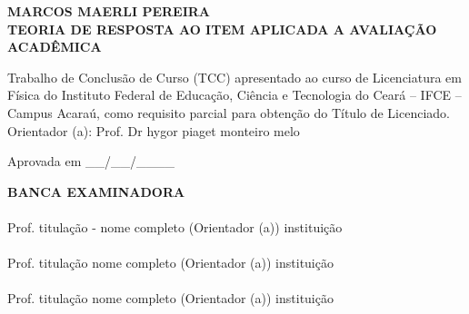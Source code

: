 \begin{center}
		\textbf{MARCOS MAERLI PEREIRA}\\
		\vspace{2cm}
		\textbf{TEORIA DE RESPOSTA AO ITEM APLICADA A AVALIAÇÃO ACADÊMICA}
	\end{center}
	\vspace{2cm}
		\hspace{\mylength}\begin{minipage}{8cm}
			
			Trabalho de Conclusão de Curso (TCC) apresentado ao curso de Licenciatura em Física do Instituto Federal
			de Educação, Ciência e Tecnologia do
			Ceará – IFCE – Campus Acaraú, como requisito
			parcial para obtenção do Título de Licenciado.
			\vspace*{0.7cm}
			\\Orientador (a): Prof. Dr hygor piaget monteiro melo
		\end{minipage}
		\par
	 \vspace{1cm}
	    Aprovada em \_\_/\_\_/\_\_\_\_\\
	    \vspace{1cm}
	\begin{center} 
	   
	    \textbf{BANCA EXAMINADORA} \\
	    \vspace{1.5cm}
    	\hrulefill\\
    	Prof. titulação - nome completo (Orientador (a))
    	instituição\\
    	\vspace{1.5cm}
    	\hrulefill\\
    	Prof. titulação nome completo (Orientador (a))
    	instituição \\
    	\vspace{1.5cm}
    	\hrulefill\\
    	Prof. titulação nome completo (Orientador (a))
    	instituição
    \end{center}
    \newpage